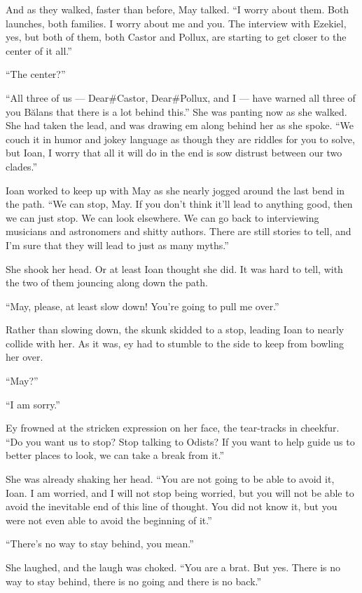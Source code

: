 And as they walked, faster than before, May talked. ``I worry about them. Both launches, both families. I worry about me and you. The interview with Ezekiel, yes, but both of them, both Castor and Pollux, are starting to get closer to the center of it all.''

``The center?''

``All three of us — Dear\#Castor, Dear\#Pollux, and I — have warned all three of you Bălans that there is a lot behind this.'' She was panting now as she walked. She had taken the lead, and was drawing em along behind her as she spoke. ``We couch it in humor and jokey language as though they are riddles for you to solve, but Ioan, I worry that all it will do in the end is sow distrust between our two clades.''

Ioan worked to keep up with May as she nearly jogged around the last bend in the path. ``We can stop, May. If you don't think it'll lead to anything good, then we can just stop. We can look elsewhere. We can go back to interviewing musicians and astronomers and shitty authors. There are still stories to tell, and I'm sure that they will lead to just as many myths.''

She shook her head. Or at least Ioan thought she did. It was hard to tell, with the two of them jouncing along down the path.

``May, please, at least slow down! You're going to pull me over.''

Rather than slowing down, the skunk skidded to a stop, leading Ioan to nearly collide with her. As it was, ey had to stumble to the side to keep from bowling her over.

``May?''

``I am sorry.''

Ey frowned at the stricken expression on her face, the tear-tracks in cheekfur. ``Do you want us to stop? Stop talking to Odists? If you want to help guide us to better places to look, we can take a break from it.''

She was already shaking her head. ``You are not going to be able to avoid it, Ioan. I am worried, and I will not stop being worried, but you will not be able to avoid the inevitable end of this line of thought. You did not know it, but you were not even able to avoid the beginning of it.''

``There's no way to stay behind, you mean.''

She laughed, and the laugh was choked. ``You are a brat. But yes. There is no way to stay behind, there is no going and there is no back.''

